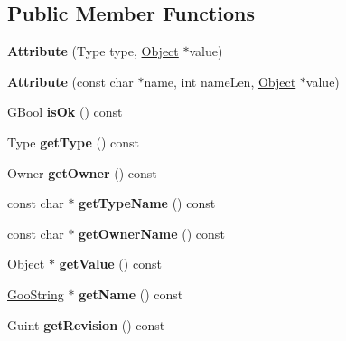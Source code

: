 \subsection*{Public Member Functions}
\begin{DoxyCompactItemize}
\item 
\mbox{\label{class_attribute_aff46652329f16530a0b4b03ecbb03569}} 
{\bfseries Attribute} (Type type, \hyperlink{class_object}{Object} $\ast$value)
\item 
\mbox{\label{class_attribute_ab624d40d01585f823d2725634da2c3ce}} 
{\bfseries Attribute} (const char $\ast$name, int name\+Len, \hyperlink{class_object}{Object} $\ast$value)
\item 
\mbox{\label{class_attribute_a818d4efcd7a6200a68dec8fa4a35475e}} 
G\+Bool {\bfseries is\+Ok} () const
\item 
\mbox{\label{class_attribute_ab81f5a3ce17c63a6209225e710f415be}} 
Type {\bfseries get\+Type} () const
\item 
\mbox{\label{class_attribute_ae13b81bb937ab8f43d35b694ddd89a91}} 
Owner {\bfseries get\+Owner} () const
\item 
\mbox{\label{class_attribute_a049753c371c5f256a6bc8b29354d7cbe}} 
const char $\ast$ {\bfseries get\+Type\+Name} () const
\item 
\mbox{\label{class_attribute_a5ec14e31c887ae196004a64ad20751d5}} 
const char $\ast$ {\bfseries get\+Owner\+Name} () const
\item 
\mbox{\label{class_attribute_a72ae0f4aea9f9cba75b283209aeff8f2}} 
\hyperlink{class_object}{Object} $\ast$ {\bfseries get\+Value} () const
\item 
\mbox{\label{class_attribute_a76b41810e3ae28a1b146894fc9fbc5dd}} 
\hyperlink{class_goo_string}{Goo\+String} $\ast$ {\bfseries get\+Name} () const
\item 
\mbox{\label{class_attribute_a75db2262c0f09e7a45ada94582c52167}} 
Guint {\bfseries get\+Revision} () const

\end{DoxyCompactItemize}
